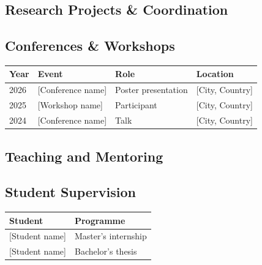\vspace{0.1cm}

\subsection*{Research Projects \& Coordination}
\pfrule



\vspace{0.1cm}

\subsection*{Conferences \& Workshops}
\pfrule

\noindent
\begin{tabularx}{\textwidth}{@{}l X l l@{}}
	\toprule
	\textbf{Year} & \textbf{Event} & \textbf{Role} & \textbf{Location} \\
	\midrule
	2026 & [Conference name] & Poster presentation & [City, Country] \\
	2025 & [Workshop name] & Participant & [City, Country] \\
	2024 & [Conference name] & Talk & [City, Country] \\
	\bottomrule
\end{tabularx}

\vspace{0.11cm}
\newpage
\subsection*{Teaching and Mentoring}
\pfrule


\vspace{0.1cm}

\subsection*{Student Supervision}
\pfrule

\noindent
\begin{tabularx}{\textwidth}{@{}X l@{}}
	\toprule
	\textbf{Student} & \textbf{Programme} \\
	\midrule
	{[Student name]} & Master's internship \\
	{[Student name]} & Bachelor's thesis \\
	\bottomrule
\end{tabularx}
